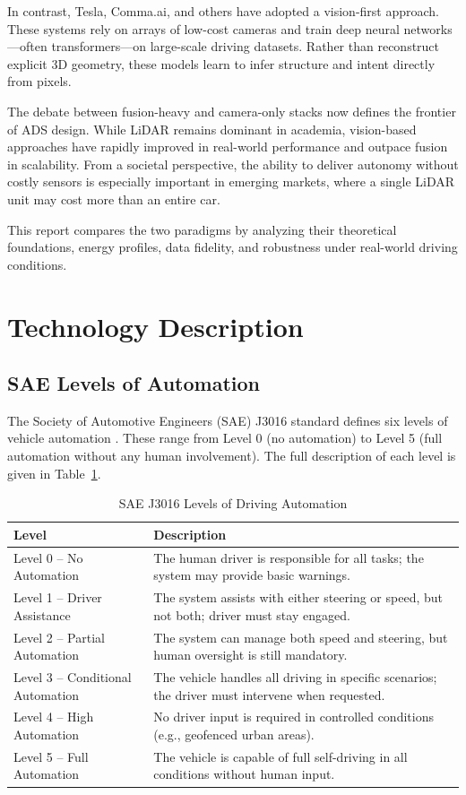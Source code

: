 \documentclass[12pt]{article}
\begin{document}
In contrast, Tesla, Comma.ai, and others have adopted a vision-first approach. These systems rely on arrays of low-cost cameras and train deep neural networks—often transformers—on large-scale driving datasets. Rather than reconstruct explicit 3D geometry, these models learn to infer structure and intent directly from pixels.

The debate between fusion-heavy and camera-only stacks now defines the frontier of ADS design. While LiDAR remains dominant in academia, vision-based approaches have rapidly improved in real-world performance and outpace fusion in scalability. From a societal perspective, the ability to deliver autonomy without costly sensors is especially important in emerging markets, where a single LiDAR unit may cost more than an entire car.

This report compares the two paradigms by analyzing their theoretical foundations, energy profiles, data fidelity, and robustness under real-world driving conditions.

\section{Technology Description}

\subsection{SAE Levels of Automation}

The Society of Automotive Engineers (SAE) J3016 standard defines six levels of
vehicle automation \cite{SAEJ3016_2021}. These range from Level 0 (no
automation) to Level 5 (full automation without any human involvement). The full
description of each level is given in Table~\ref{tab:sae}.

\begin{table}[H]
  \centering
  \caption{SAE J3016 Levels of Driving Automation}
  \label{tab:sae}
  \begin{tabular}{|p{5.5cm}|p{9.5cm}|}
    \hline
    \textbf{Level} & \textbf{Description} \\
    \hline
    Level 0 – No Automation & The human driver is responsible for all tasks; the system may provide basic warnings. \\
    \hline
    Level 1 – Driver Assistance & The system assists with either steering or speed, but not both; driver must stay engaged. \\
    \hline
    Level 2 – Partial Automation & The system can manage both speed and steering, but human oversight is still mandatory. \\
    \hline
    Level 3 – Conditional Automation & The vehicle handles all driving in specific scenarios; the driver must intervene when requested. \\
    \hline
    Level 4 – High Automation & No driver input is required in controlled conditions (e.g., geofenced urban areas). \\
    \hline
    Level 5 – Full Automation & The vehicle is capable of full self-driving in all conditions without human input. \\
    \hline
  \end{tabular}
\end{table}
\end{document}
